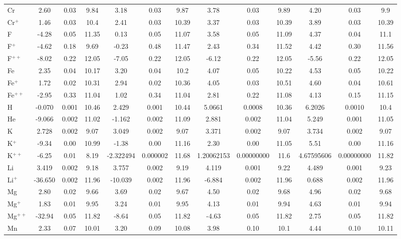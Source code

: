 \begin{longtable}{l!{\vrule width 0.25pt}ccc!{\vrule width 0.25pt}ccc!{\vrule width 0.25pt}ccc!{\vrule width 0.25pt}ccc}
Cr & 2.60 & 0.03 & 9.84 & 3.18 & 0.03 & 9.87 & 3.78 & 0.03 & 9.89 & 4.20 & 0.03 & 9.9 \\
Cr$^+$ & 1.46 & 0.03 & 10.4 & 2.41 & 0.03 & 10.39 & 3.37 & 0.03 & 10.39 & 3.89 & 0.03 & 10.39 \\
F & -4.28 & 0.05 & 11.35 & 0.13 & 0.05 & 11.07 & 3.58 & 0.05 & 11.09 & 4.37 & 0.04 & 11.1 \\
F$^+$ & -4.62 & 0.18 & 9.69 & -0.23 & 0.48 & 11.47 & 2.43 & 0.34 & 11.52 & 4.42 & 0.30 & 11.56 \\
F$^{++}$ & -8.02 & 0.22 & 12.05 & -7.05 & 0.22 & 12.05 & -6.12 & 0.22 & 12.05 & -5.56 & 0.22 & 12.05 \\
Fe & 2.35 & 0.04 & 10.17 & 3.20 & 0.04 & 10.2 & 4.07 & 0.05 & 10.22 & 4.53 & 0.05 & 10.22 \\
Fe$^+$ & 1.72 & 0.02 & 10.31 & 2.94 & 0.02 & 10.36 & 4.05 & 0.03 & 10.51 & 4.60 & 0.04 & 10.61 \\
Fe$^{++}$ & -2.95 & 0.33 & 11.04 & 1.02 & 0.34 & 11.04 & 2.81 & 0.22 & 11.08 & 4.13 & 0.15 & 11.15 \\
H & -0.070 & 0.001 & 10.46 & 2.429 & 0.001 & 10.44 & 5.0661 & 0.0008 & 10.36 & 6.2026 & 0.0010 & 10.4 \\
He & -9.066 & 0.002 & 11.02 & -1.162 & 0.002 & 11.09 & 2.881 & 0.002 & 11.04 & 5.249 & 0.001 & 11.05 \\
K & 2.728 & 0.002 & 9.07 & 3.049 & 0.002 & 9.07 & 3.371 & 0.002 & 9.07 & 3.734 & 0.002 & 9.07 \\
K$^+$ & -9.34 & 0.00 & 10.99 & -1.38 & 0.00 & 11.16 & 2.30 & 0.00 & 11.05 & 5.51 & 0.00 & 11.16 \\
K$^{++}$ & -6.25 & 0.01 & 8.19 & -2.322494 & 0.000002 & 11.68 & 1.20062153 & 0.00000000 & 11.6 & 4.67595606 & 0.00000000 & 11.82 \\
Li & 3.419 & 0.002 & 9.18 & 3.757 & 0.002 & 9.19 & 4.119 & 0.001 & 9.22 & 4.489 & 0.001 & 9.23 \\
Li$^+$ & -36.650 & 0.002 & 11.96 & -10.039 & 0.002 & 11.96 & -6.884 & 0.002 & 11.96 & 0.688 & 0.002 & 11.96 \\
Mg & 2.80 & 0.02 & 9.66 & 3.69 & 0.02 & 9.67 & 4.50 & 0.02 & 9.68 & 4.96 & 0.02 & 9.68 \\
Mg$^+$ & 1.83 & 0.01 & 9.95 & 3.24 & 0.01 & 9.95 & 4.13 & 0.01 & 9.94 & 4.63 & 0.01 & 9.94 \\
Mg$^{++}$ & -32.94 & 0.05 & 11.82 & -8.64 & 0.05 & 11.82 & -4.63 & 0.05 & 11.82 & 2.75 & 0.05 & 11.82 \\
Mn & 2.33 & 0.07 & 10.01 & 3.20 & 0.09 & 10.08 & 3.98 & 0.10 & 10.1 & 4.44 & 0.10 & 10.11 \\

\end{longtable}
